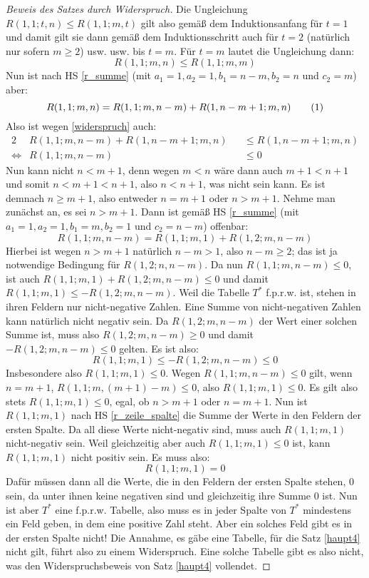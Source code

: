 \begin{proof}[Beweis des Satzes durch Widerspruch]
    Die Ungleichung $R(1, 1; t, n)\leq R(1, 1; m, t)$ gilt also gemäß dem Induktionsanfang für $t=1$ und damit gilt sie 
    dann gemäß dem Induktionsschritt auch für $t=2$ (natürlich nur sofern $m\geq 2$) usw. usw. bis $t=m$. Für $t=m$ 
    lautet die Ungleichung dann:
    \[
        R(1, 1; m, n)\leq R(1, 1; m, m)
    \]
    Nun ist nach HS \ref{r_summe} (mit $a_1=1, a_2=1, b_1=n-m, b_2=n$ und $c_2=m$) aber:
    \[
    R(1, 1; m, n)=R(1, 1; m, n-m)+R(1, n-m+1; m, n) \numberthis \label{widerspruch}
    \]
    Also ist wegen \eqref{widerspruch} auch:
    \begin{alignat*}{2}
        &R(1, 1; m, n-m)+R(1, n-m+1; m, n)&&\leq R(1, n-m+1; m, n)\\
        \Leftrightarrow &R(1, 1; m, n-m)&&\leq 0
    \end{alignat*}
    Nun kann nicht $n<m+1$, denn wegen $m<n$ wäre dann auch $m+1<n+1$ und somit $n<m+1<n+1$, also 
    $n<n+1$, was nicht sein kann. Es ist demnach $n\geq m+1$, also entweder $n=m+1$ oder $n>m+1$. Nehme man zunächst 
    an, es sei $n>m+1$. Dann ist gemäß HS \ref{r_summe} (mit $a_1=1, a_2=1, b_1=m, b_2=1$ und $c_2=n-m$) 
    offenbar:
    \[
        R(1, 1; m, n-m)=R(1, 1; m, 1)+R(1, 2; m, n-m)
    \]
    Hierbei ist wegen $n>m+1$ natürlich $n-m>1$, also $n-m\geq 2$; das ist ja notwendige Bedingung für $R(1, 2; n, 
    n-m)$. Da nun $R(1, 1; m, n-m)\leq 0$, ist auch $R(1, 1; m, 1)+R(1, 2; m, n-m)\leq 0$ und damit $R(1, 1; m, 1)
    \leq -R(1, 2; m, n-m)$. Weil die Tabelle $T^*$ f.p.r.w. ist, stehen in ihren Feldern nur nicht-negative Zahlen. 
    Eine Summe von nicht-negativen Zahlen kann natürlich nicht negativ sein. Da $R(1, 2; m, n-m)$ der Wert einer 
    solchen Summe ist, muss also $R(1, 2; m, n-m)\geq 0$ und damit $-R(1, 2; m, n-m)\leq 0$ gelten. Es ist also:
    \[
        R(1, 1; m, 1)\leq -R(1, 2; m, n-m)\leq 0
    \]
    Insbesondere also $R(1, 1; m, 1)\leq 0$. Wegen $R(1, 1; m, n-m)\leq 0$ gilt, wenn $n=m+1$, $R(1, 1; m, (m+1)-m)
    \leq 0$, also $R(1, 1; m, 1)\leq 0$. Es gilt also stets $R(1, 1; m, 1)\leq 0$, egal, ob $n>m+1$ oder $n=m+1$. 
    Nun ist $R(1, 1; m, 1)$ nach HS \ref{r_zeile_spalte} die Summe der Werte in den Feldern der ersten Spalte. Da 
    all diese Werte nicht-negativ sind, muss auch $R(1, 1; m, 1)$ nicht-negativ sein. Weil gleichzeitig aber auch 
    $R(1, 1; m, 1)\leq 0$ ist, kann $R(1, 1; m, 1)$ nicht positiv sein. Es muss also:
    \[
    R(1, 1; m, 1)= 0
    \]
    Dafür müssen dann all die Werte, die in den Feldern der ersten Spalte stehen, 0 sein, da unter ihnen keine 
    negativen sind und gleichzeitig ihre Summe 0 ist. Nun ist aber $T^*$ eine f.p.r.w. Tabelle, also muss es in jeder 
    Spalte von $T^*$ mindestens ein Feld geben, in dem eine positive Zahl steht. Aber ein solches Feld gibt es in 
    der ersten Spalte nicht! Die Annahme, es gäbe eine Tabelle, für die Satz \ref{haupt4} nicht gilt, führt also zu 
    einem Widerspruch. Eine solche Tabelle gibt es also nicht, was den Widerspruchsbeweis von Satz \ref{haupt4} vollendet.
    \renewcommand{\qedsymbol}{$\blacksquare$}
\end{proof}